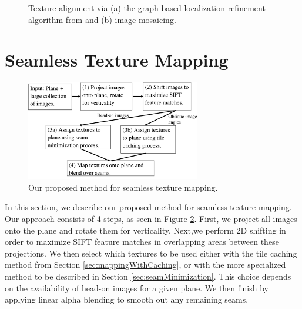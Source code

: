 \message{ !name(oldpaper.tex)}\documentclass[10pt,twocolumn,letterpaper]{article}
\begin{document}
\begin{figure}
  \centering

  \centering {}
  \caption{Texture alignment via (a) the graph-based localization
    refinement algorithm from \cite{chen2010indoor} and (b) image
    mosaicing.}
  \label{fig:mosaic3D}
\end{figure}




\section{Seamless Texture Mapping}
\label{sec:proposedApproach}

\begin{figure}
  \centering
  \includegraphics[width=3in]{pipeline.pdf}
  \caption{Our proposed method for seamless texture mapping.}
  \label{fig:pipeline}
\end{figure}


In this section, we describe our proposed method for seamless texture
mapping. Our approach consists of 4 steps, as seen in Figure
\ref{fig:pipeline}.  First, we project all images onto the plane and
rotate them for verticality. Next,we perform 2D shifting in order to
maximize SIFT feature matches in overlapping areas between these
projections. We then select which textures to be used either with the
tile caching method from Section \ref{sec:mappingWithCaching}, or with
the more specialized method to be described in Section
\ref{sec:seamMinimization}. This choice depends on the availability of
head-on images for a given plane. We then finish by applying linear
alpha blending to smooth out any remaining seams.
\end{document}

